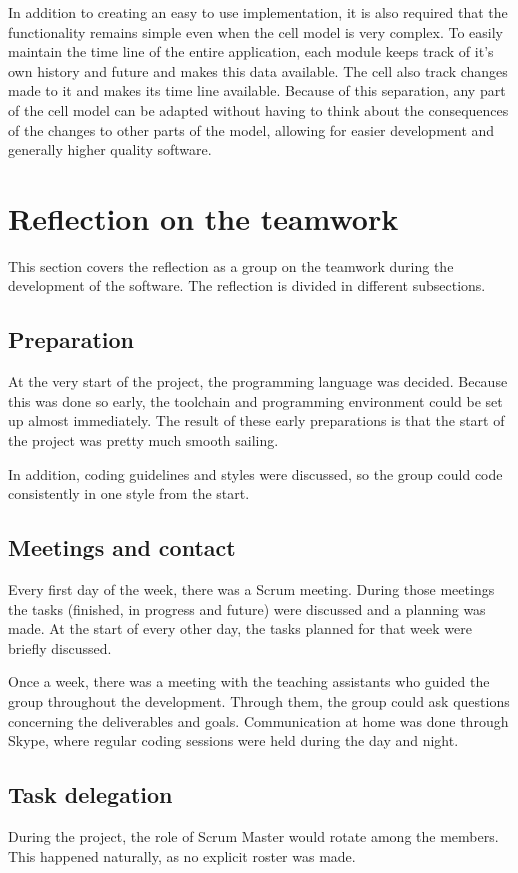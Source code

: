 \documentclass[10pt,a4paper]{report}
\begin{document}
			In addition to creating an easy to use implementation, it is also required that the functionality remains simple even when the cell model is very complex. To easily maintain the time line of the entire application, each module keeps track of it's own history and future and makes this data available. The cell also track changes made to it and makes its time line available. Because of this separation, any part of the cell model can be adapted without having to think about the consequences of the changes to other parts of the model, allowing for easier development and generally higher quality software.
	
	\section{Reflection on the teamwork}
		This section covers the reflection as a group on the teamwork during the development of the software. The reflection is divided in different subsections.
		\subsection{Preparation}
			At the very start of the project, the programming language was decided. Because this was done so early, the toolchain and programming environment could be set up almost immediately. The result of these early preparations is that the start of the project was pretty much smooth sailing.
			
			In addition, coding guidelines and styles were discussed, so the group could code consistently in one style from the start.
		
		\subsection{Meetings and contact}
			Every first day of the week, there was a Scrum meeting. During those meetings the tasks (finished, in progress and future) were discussed and a planning was made. At the start of every other day, the tasks planned for that week were briefly discussed.
			
			Once a week, there was a meeting with the teaching assistants who guided the group throughout the development. Through them, the group could ask questions concerning the deliverables and goals.
			Communication at home was done through Skype, where regular coding sessions were held during the day and night.

		\subsection{Task delegation}
			During the project, the role of Scrum Master would rotate among the members. This happened naturally, as no explicit roster was made.
			
\end{document}
